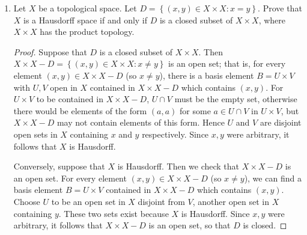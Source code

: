 \documentclass[11pt]{article}
\newcommand{\cbr}[1]{\left\{#1\right\}}
\begin{document}
\begin{enumerate}
\begin{proof}
      The intersection of two basis elements $[a,b)$ and $[c,d)$ ($a,b,c,d$ rational and $a<b, c<d$) is either empty or is of the form $[c,b)$ or $[a,d)$ when $c < b$ or $a < d$ respectively. If $a = c$ and $b = d$ then the intersection is $[a,b) = [c,d)$. If one basis element is completely contained in the other, then the intersection is another half-open interval with rational endpoints. In all cases a nonempty intersection of basis elements is a basis element.

      Hence $\mathcal{B}$ is a basis for a topology on $\mathbb{R}$.

      The open set $[\pi, 4)$ in the lower limit topology is not open in the topology generated by $\mathcal{B}$, because $\pi$ is irrational. There are no basis elements of $\mathcal{B}$ in the form $[a,b)$ for rational $a,b$ which contain $\pi$, and is contained in $[\pi,4)$; otherwise $a = \pi$ which is impossible. It follows then that the topology generated by $\mathcal{B}$ is different from the lower limit topology.
    \end{proof}
    \item Let $X$ be a topological space. Let $D = \cbr{(x,y)\in X\times X \colon x = y}$. Prove that $X$ is a Hausdorff space if and only if $D$ is a closed subset of $X\times X$, where $X\times X$ has the product topology.
    \begin{proof}
      Suppose that $D$ is a closed subset of $X\times X$. Then $X\times X - D = \cbr{(x,y)\in X\times X\colon x\neq y}$ is an open set; that is, for every element $(x,y)\in X\times X - D$ (so $x\neq y$), there is a basis element $B = U\times V$ with $U,V$ open in $X$ contained in $X\times X- D$ which contains $(x,y)$. For $U\times V$ to be contained in $X\times X - D$, $U\cap V$ must be the empty set, otherwise there would be elements of the form $(a,a)$ for some $a\in U\cap V$ in $U\times V$, but $X\times X - D$ may not contain elements of this form. Hence $U$ and $V$ are disjoint open sets in $X$ containing $x$ and $y$ respectively. Since $x,y$ were arbitrary, it follows that $X$ is Hausdorff.

      Conversely, suppose that $X$ is Hausdorff. Then we check that $X\times X-D$ is an open set. For every element $(x,y)\in X\times X - D$ (so $x\neq y$), we can find a basis element $B = U\times V$ contained in $X\times X- D$ which contains $(x,y)$. Choose $U$ to be an open set in $X$ disjoint from $V$, another open set in $X$ containing $y$. These two sets exist because $X$ is Hausdorff. Since $x,y$ were arbitrary, it follows that $X\times X - D$ is an open set, so that $D$ is closed.


\end{proof}
\end{enumerate}
\end{document}
